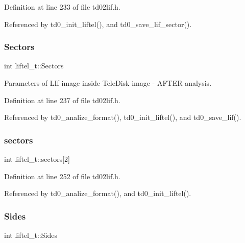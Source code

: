 Definition at line 233 of file td02lif.\+h.



Referenced by td0\+\_\+init\+\_\+liftel(), and td0\+\_\+save\+\_\+lif\+\_\+sector().

\mbox{\label{structliftel__t_aa20cc45cd196c86b7d6176914226eacf}} 
\subsubsection{\texorpdfstring{Sectors}{Sectors}}
{\footnotesize\ttfamily int liftel\+\_\+t\+::\+Sectors}



Parameters of L\+If image inside Tele\+Disk image -\/ A\+F\+T\+ER analysis. 



Definition at line 237 of file td02lif.\+h.



Referenced by td0\+\_\+analize\+\_\+format(), td0\+\_\+init\+\_\+liftel(), and td0\+\_\+save\+\_\+lif().

\mbox{\label{structliftel__t_a04c852b0fdc7a7c04d558d9a201f3f0d}} 
\subsubsection{\texorpdfstring{sectors}{sectors}}
{\footnotesize\ttfamily int liftel\+\_\+t\+::sectors\mbox{[}2\mbox{]}}



Definition at line 252 of file td02lif.\+h.



Referenced by td0\+\_\+analize\+\_\+format(), and td0\+\_\+init\+\_\+liftel().

\mbox{\label{structliftel__t_a1fafd0f113738152a2ae6251c2f528f7}} 
\subsubsection{\texorpdfstring{Sides}{Sides}}
{\footnotesize\ttfamily int liftel\+\_\+t\+::\+Sides}



